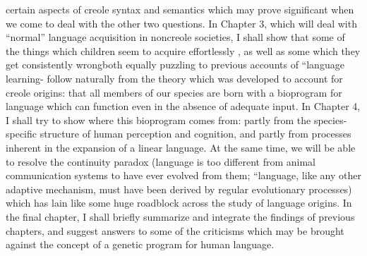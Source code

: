 certain aspects of creole syntax and semantics which may prove signifi\-cant when we come to deal with the other two questions. In Chapter 3, which will deal with ``normal'' language acquisition in noncreole societies, I shall show that some of the things which children seem to acquire effortlessly , as well as some which they get consistently wrong\-both equally puzzling to previous accounts of ``language learning{\textquotedbl}{}- follow naturally from the theory which was developed to account for creole origins: that all members of our species are born with a bio\-program for language which can function even in the absence of ade\-quate input. In Chapter 4, I shall try to show where this bioprogram comes from: partly from the species-specific structure of human perception and cognition, and partly from processes inherent in the expansion of a linear language. At the same time, we will be able to resolve the continuity paradox ({\textquotedbl}language is too different from animal communication systems to have ever evolved from them{\textquotedbl}; ``language, like any other adaptive mechanism, must have been derived by regular evolutionary processes{\textquotedbl}) which has lain like some huge roadblock across the study of language origins. In the final chapter, I shall briefly summarize and integrate the findings of previous chapters, and suggest answers to some of the criticisms which may be brought against the concept of a genetic program for human language.